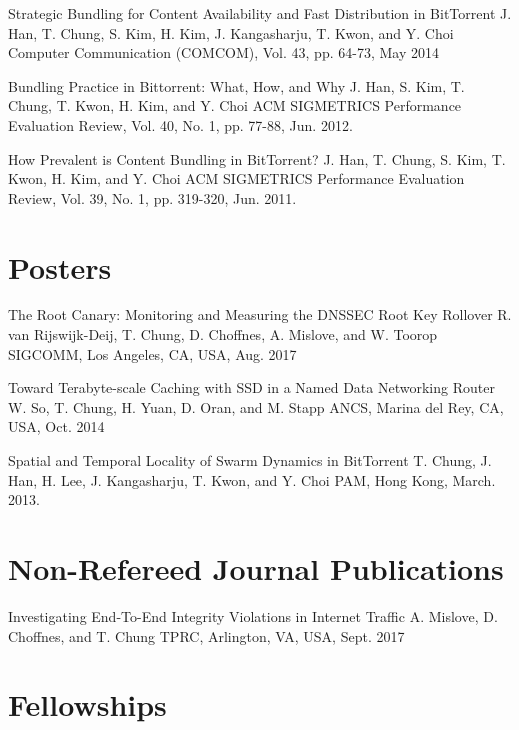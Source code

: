 \documentclass[11pt,a4paper,sans]{moderncv}        %
\begin{document}
\publication{}
{Strategic Bundling for Content Availability and Fast Distribution in BitTorrent}
{J. Han, \textcolor{colortj}{T. Chung}, S. Kim, H. Kim, J. Kangasharju, T. Kwon, and Y. Choi}
{Computer Communication (COMCOM), Vol. 43, pp. 64-73, May 2014}


\publication{}
{Bundling Practice in Bittorrent: What, How, and Why}
{J. Han, S. Kim, \textcolor{colortj}{T. Chung}, T. Kwon, H. Kim, and Y. Choi}
{ACM SIGMETRICS Performance Evaluation Review, Vol. 40, No. 1, pp. 77-88, Jun. 2012.}

\publication{}
{How Prevalent is Content Bundling in BitTorrent? }
{J. Han, \textcolor{colortj}{T. Chung}, S. Kim, T. Kwon, H. Kim, and Y. Choi}
{ACM SIGMETRICS Performance Evaluation Review, Vol. 39, No. 1, pp. 319-320, Jun. 2011.}

\section{Posters}
{The Root Canary: Monitoring and Measuring the DNSSEC Root Key Rollover}
{R. van Rijswijk-Deij, \textcolor{colortj}{T. Chung}, D. Choffnes, A. Mislove, and W. Toorop}
{SIGCOMM, Los Angeles, CA, USA, Aug. 2017}

{Toward Terabyte-scale Caching with SSD in a Named Data Networking Router}
{W. So, \textcolor{colortj}{T. Chung}, H. Yuan, D. Oran, and M. Stapp}
{ANCS, Marina del Rey, CA, USA, Oct. 2014 }

{Spatial and Temporal Locality of Swarm Dynamics in BitTorrent}
{\textcolor{colortj}{T. Chung}, J. Han, H. Lee, J. Kangasharju, T. Kwon, and Y. Choi}
{PAM, Hong Kong, March. 2013.}

\section{Non-Refereed Journal Publications}
{Investigating End-To-End Integrity Violations in Internet Traffic}
{A. Mislove, D. Choffnes, and \textcolor{colortj}{T. Chung}}
{TPRC, Arlington, VA, USA, Sept. 2017}

\section{Fellowships}
 {}{}{}{}{}
\end{document}
